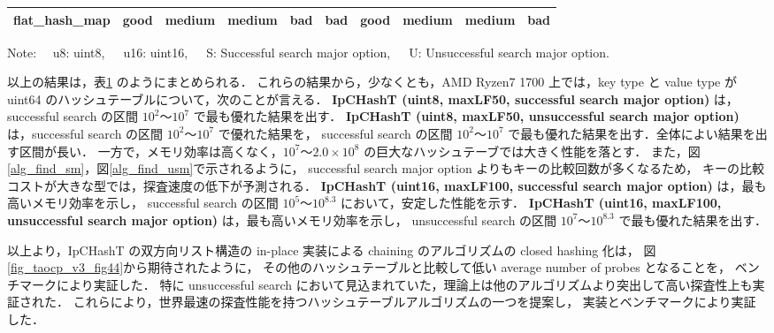 \begin{table}
\begin{center}
\begin{tabular}{c|c|ccc|ccc|c|c}
        flat\_hash\_map        & \cellcolor{cGood}good   & \cellcolor{cMedi}medium & \cellcolor{cMedi}medium & \cellcolor{cBad }bad    & \cellcolor{cBad }bad    & \cellcolor{cGood}good   & \cellcolor{cMedi}medium  & \cellcolor{cMedi}medium & \cellcolor{cBad }bad  \rule[0pt]{0pt}{15pt} \\ \hline
    \end{tabular}
    Note: \ \ u8: uint8,\ \ \ u16: uint16,\ \ \ S: Successful search major option,\ \ \ U: Unsuccessful search major option.
    \label{table_hashT_cmp}
  \end{center}
\end{table}

以上の結果は，表\ref{table_hashT_cmp} のようにまとめられる．
これらの結果から，少なくとも，AMD Ryzen7 1700 上では，key type と value type が uint64 のハッシュテーブルについて，次のことが言える．
{\bf IpCHashT (uint8, maxLF50, successful search major option)} は，successful search の区間 $10^2〜10^7$ で最も優れた結果を出す．
{\bf IpCHashT (uint8, maxLF50, unsuccessful search major option)} は，successful search の区間 $10^2〜10^7$ で優れた結果を，
successful search の区間 $10^2〜10^7$ で最も優れた結果を出す．全体によい結果を出す区間が長い．
一方で，メモリ効率は高くなく，$10^7〜2.0\times10^8$ の巨大なハッシュテーブでは大きく性能を落とす．
また，図\ref{alg_find_sm}，図\ref{alg_find_usm}で示されるように，
successful search major option よりもキーの比較回数が多くなるため，
キーの比較コストが大きな型では，探査速度の低下が予測される．
{\bf IpCHashT (uint16, maxLF100, successful search major option)} は，最も高いメモリ効率を示し，
successful search の区間 $10^5〜10^{8.3}$ において，安定した性能を示す．
{\bf IpCHashT (uint16, maxLF100, unsuccessful search major option)} は，最も高いメモリ効率を示し，
unsuccessful search の区間 $10^7〜10^{8.3}$ で最も優れた結果を出す．

以上より，IpCHashT の双方向リスト構造の in-place 実装による chaining のアルゴリズムの closed hashing 化は，
図\ref{fig_taocp_v3_fig44}から期待されたように，
その他のハッシュテーブルと比較して低い average number of probes となることを，
ベンチマークにより実証した．
特に unsuccessful search において見込まれていた，理論上は他のアルゴリズムより突出して高い探査性上も実証された．
これらにより，世界最速の探査性能を持つハッシュテーブルアルゴリズムの一つを提案し，
実装とベンチマークにより実証した．

